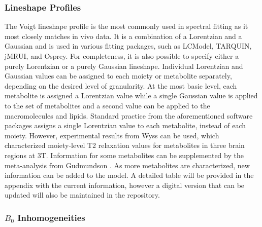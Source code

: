 \subsubsection{Lineshape Profiles}\label{subsubsec:lineshapes}
The Voigt lineshape profile is the most commonly used in spectral fitting as it most closely matches in vivo data.
It is a combination of a Lorentzian and a Gaussian and is used in various fitting packages, such as LCModel\cite{Provencher2001}, TARQUIN\cite{Wilson2011}, jMRUI\cite{Stefan2009}, and Osprey\cite{Oeltzschner2020}. For completeness, it is also possible to specify either a purely Lorentzian or a purely Gaussian lineshape. 
Individual Lorentzian and Gaussian values can be assigned to each moiety or metabolite separately, depending on the desired level of granularity. At the most basic level, each metabolite is assigned a Lorentzian value while a single Gaussian value is applied to the set of metabolites and a second value can be applied to the macromolecules and lipids. Standard practice from the aforementioned software packages assigns a single Lorentzian value to each metabolite, instead of each moiety. However, experimental results from Wyss \etal\cite{Wyss2018} can be used, which characterized moiety-level T2 relaxation values for metabolites in three brain regions at 3T. Information for some metabolites can be supplemented by the meta-analysis from Gudmundson \etal\cite{Gudmundson2023}. As more metabolites are characterized, new information can be added to the model. A detailed table will be provided in the appendix with the current information, however a digital version that can be updated will also be maintained in the repository.
 
\subsubsection{$B_0$ Inhomogeneities}

